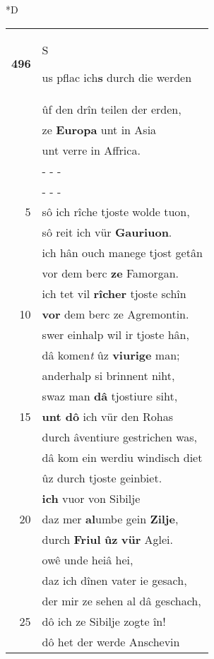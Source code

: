 \documentclass[8pt,a4paper,notitlepage]{article}
\begin{document}
\begin{table}[ht]
\begin{minipage}[t]{0.5\linewidth}
\small
\begin{center}*D
\end{center}
\begin{tabular}{rl}
\textbf{496} & \begin{large}S\end{large}us pflac ich\textbf{s} durch die werden\\ 
 & ûf den drîn teilen der erden,\\ 
 & ze \textbf{Europa} unt in Asia\\ 
 & unt verre in Affrica.\\ 
 & \multicolumn{1}{l}{ - - - }\\ 
 & \multicolumn{1}{l}{ - - - }\\ 
5 & sô ich rîche tjoste wolde tuon,\\ 
 & sô reit ich vür \textbf{Gauriuon}.\\ 
 & ich hân ouch manege tjost getân\\ 
 & vor dem berc \textbf{ze} Famorgan.\\ 
 & ich tet vil \textbf{rîcher} tjoste schîn\\ 
10 & \textbf{vor} dem berc ze Agremontin.\\ 
 & swer einhalp wil ir tjoste hân,\\ 
 & dâ komen\textit{t} ûz \textbf{viurige} man;\\ 
 & anderhalp si brinnent niht,\\ 
 & swaz man \textbf{dâ} tjostiure siht,\\ 
15 & \textbf{unt dô} ich vür den Rohas\\ 
 & durch âventiure gestrichen was,\\ 
 & dâ kom ein werdiu windisch diet\\ 
 & ûz durch tjoste geinbiet.\\ 
 & \textbf{ich} vuor von Sibilje\\ 
20 & daz mer \textbf{al}umbe gein \textbf{Zilje},\\ 
 & durch \textbf{Friul} \textbf{ûz} \textbf{vür} Aglei.\\ 
 & owê unde heiâ hei,\\ 
 & daz ich dînen vater ie gesach,\\ 
 & der mir ze sehen al dâ geschach,\\ 
25 & dô ich ze Sibilje zogte în!\\ 
 & dô het der werde Anschevin\\ 

\end{tabular}
\end{minipage}
\end{table}
\end{document}
